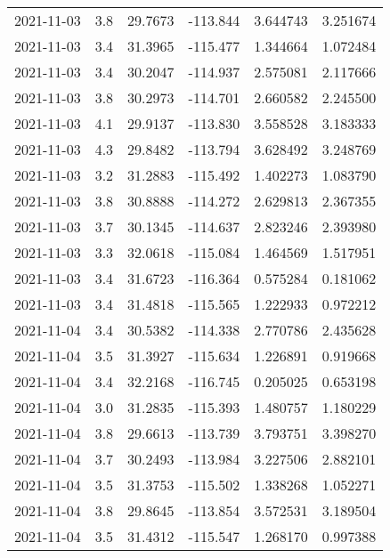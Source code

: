 \begin{tabular}{lrrrrr}
2021-11-03 &       3.8 &  29.7673 &  -113.844 &         3.644743 &         3.251674 \\
2021-11-03 &       3.4 &  31.3965 &  -115.477 &         1.344664 &         1.072484 \\
2021-11-03 &       3.4 &  30.2047 &  -114.937 &         2.575081 &         2.117666 \\
2021-11-03 &       3.8 &  30.2973 &  -114.701 &         2.660582 &         2.245500 \\
2021-11-03 &       4.1 &  29.9137 &  -113.830 &         3.558528 &         3.183333 \\
2021-11-03 &       4.3 &  29.8482 &  -113.794 &         3.628492 &         3.248769 \\
2021-11-03 &       3.2 &  31.2883 &  -115.492 &         1.402273 &         1.083790 \\
2021-11-03 &       3.8 &  30.8888 &  -114.272 &         2.629813 &         2.367355 \\
2021-11-03 &       3.7 &  30.1345 &  -114.637 &         2.823246 &         2.393980 \\
2021-11-03 &       3.3 &  32.0618 &  -115.084 &         1.464569 &         1.517951 \\
2021-11-03 &       3.4 &  31.6723 &  -116.364 &         0.575284 &         0.181062 \\
2021-11-03 &       3.4 &  31.4818 &  -115.565 &         1.222933 &         0.972212 \\
2021-11-04 &       3.4 &  30.5382 &  -114.338 &         2.770786 &         2.435628 \\
2021-11-04 &       3.5 &  31.3927 &  -115.634 &         1.226891 &         0.919668 \\
2021-11-04 &       3.4 &  32.2168 &  -116.745 &         0.205025 &         0.653198 \\
2021-11-04 &       3.0 &  31.2835 &  -115.393 &         1.480757 &         1.180229 \\
2021-11-04 &       3.8 &  29.6613 &  -113.739 &         3.793751 &         3.398270 \\
2021-11-04 &       3.7 &  30.2493 &  -113.984 &         3.227506 &         2.882101 \\
2021-11-04 &       3.5 &  31.3753 &  -115.502 &         1.338268 &         1.052271 \\
2021-11-04 &       3.8 &  29.8645 &  -113.854 &         3.572531 &         3.189504 \\
2021-11-04 &       3.5 &  31.4312 &  -115.547 &         1.268170 &         0.997388 \\

\end{tabular}

